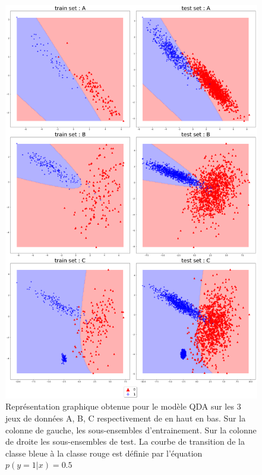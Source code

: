 \documentclass[12pt,a4paper,onecolumn]{article}
\begin{document}
\begin{figure}[H]
	\centering
	\includegraphics[height = 0.9\textheight]{QDA}
	\caption{Représentation graphique obtenue pour le modèle QDA sur les 3 jeux de données A, B, C respectivement de en haut en bas. Sur la colonne de gauche, les sous-ensembles d'entrainement. Sur la colonne de droite les sous-ensembles de test. La courbe de transition de la classe bleue à la classe rouge est définie par l'équation \( p(y = 1 | x) = 0.5\)}
	\label{fig:QDA}
\end{figure}
\end{document}
